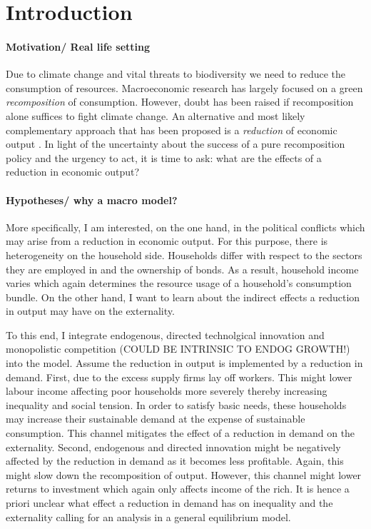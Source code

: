\section{Introduction}

\paragraph{Motivation/ Real life setting}
Due to climate change and vital threats to biodiversity we need to reduce the consumption of resources. %
Macroeconomic research has largely focused on a green \textit{recomposition} of consumption. However, doubt has been raised if recomposition alone suffices to fight climate change. An alternative and most likely complementary approach that has been proposed is a \textit{reduction} of economic output \citep[e.g.][]{Dasgupta2021}. %
In light of the uncertainty about the success of a pure recomposition policy and the urgency to act, it is time to ask: what are the effects of a reduction in economic output? 

\paragraph{Hypotheses/ why a macro model?}
More specifically, I am interested, on the one hand, in the political conflicts which may arise from a reduction in economic output. For this purpose, there is heterogeneity on the household side. 
Households differ with respect to the sectors they are employed in and the ownership of bonds. As a result, household income varies which again determines the resource usage of a household's consumption bundle.  
On the other hand, I want to learn about the indirect effects a reduction in output may have on the externality. 

To this end, I integrate  endogenous, directed technolgical innovation and monopolistic competition (COULD BE INTRINSIC TO ENDOG GROWTH!) into the model. Assume the reduction in output is implemented by a reduction in demand. First, due to the excess supply firms lay off workers. This might lower labour income affecting poor households more severely thereby increasing inequality and social tension. In order to satisfy basic needs, these households may increase their sustainable demand at the expense of sustainable consumption. This channel mitigates the effect of a reduction in demand on the externality. 
Second, endogenous and directed innovation might be negatively affected by the reduction in demand as it becomes less profitable. Again, this might slow down the recomposition of output. However, this channel might lower returns to investment which again only affects income of the rich. 
It is hence a priori unclear what effect a reduction in demand has on inequality and the externality calling for an analysis in a general equilibrium model. 


